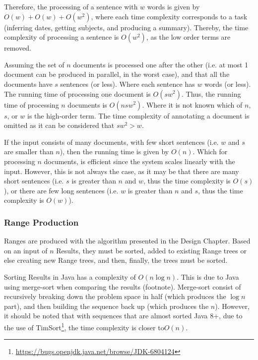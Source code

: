 \par Therefore, the processing of a sentence with $w$ words is given by $O(w)+O(w)+O(w^2)$, where each time complexity corresponds to a task (inferring dates, getting subjects, and producing a summary). Thereby, the time complexity of processing a sentence is $O(w^2)$, as the low order terms are removed. 
\par Assuming the set of $n$ documents is processed one after the other (i.e. at most 1 document can be produced in parallel, in the worst case), and that all the documents have $s$ sentences (or less). Where each sentence has $w$ words (or less). The running time of processing one document is $O(sw^2)$. Thus, the running time of processing $n$ documents is $O(nsw^2)$. Where it is not known which of $n$, $s$, or $w$ is the high-order term. The time complexity of annotating a document is omitted as it can be considered that $sw^2 > w$.

\par If the input consists of many documents, with few short sentences (i.e. $w$ and $s$ are smaller than $n$), then the running time is given by $O(n)$. Which for processing $n$ documents, is efficient since the system scales linearly with the input. However, this is not always the case, as it may be that there are many short sentences (i.e. $s$ is greater than $n$ and $w$, thus the time complexity is $O(s)$), or there are few long sentences (i.e. $w$ is greater than $n$ and $s$, thus the time complexity is $O(w)$).

\subsubsection{Range Production}
\par Ranges are produced with the algorithm presented in the Design Chapter. Based on an input of $n$ Results, they must be sorted, added to existing Range trees or else creating new Range trees, and then, finally, the trees must be sorted.

\par Sorting Results in Java has a complexity of $O(n\log n)$. This is due to Java using merge-sort when comparing the results (footnote). Merge-sort consist of recursively breaking down the problem space in half (which produces the $\log n$ part), and then building the sequence back up (which produces the $n$). However, it should be noted that with sequences that are almost sorted Java 8+, due to the use of TimSort\footnote{\url{https://bugs.openjdk.java.net/browse/JDK-6804124}}, the time complexity is closer to$O(n)$. 

